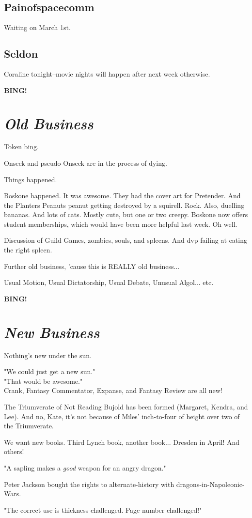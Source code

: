 \documentclass[10pt]{article}
\newcommand{\bing}{{\bf BING!} }
\newcommand{\goto}[1]{\bing \vskip 12pt \section*{{\em{#1}}}}
\begin{document}
\subsection*{Painofspacecomm}

Waiting on March 1st.

\subsection*{Seldon}

Coraline tonight--movie nights will happen after next week otherwise.

\goto{Old Business}

Token bing.

Onseck and pseudo-Onseck are in the process of dying.

Things happened.

Boskone happened. It was awesome. They had the cover art for Pretender. And
the Planters Peanuts peanut getting destroyed by a squirell. Rock. Also,
duelling bananas. And lots of cats. Mostly cute, but one or two creepy.
Boskone now offers student memberships, which would have been more helpful
last week. Oh well.

Discussion of Guild Games, zombies, souls, and spleens. And dvp failing at
eating the right spleen.

Further old business, 'cause this is REALLY old business...

Usual Motion, Usual Dictatorship, Usual Debate, Unusual Algol... etc.

\goto{New Business}

Nothing's new under the sun.

"We could just get a new sun."\\
"That would be awesome."\\

Crank, Fantasy Commentator, Expanse, and Fantasy Review are all new!

The Triumverate of Not Reading Bujold has been formed (Margaret, Kendra, and
Lee). And no, Kate, it's not because of Miles' inch-to-four of height over two
of the Triumverate.

We want new books. Third Lynch book, another book... Dresden in April! And others!

"A sapling makes a \emph{good} weapon for an angry dragon."

Peter Jackson bought the rights to alternate-history with dragons-in-Napoleonic-Wars.

"The correct use is thickness-challenged. Page-number challenged!"
\end{document}
